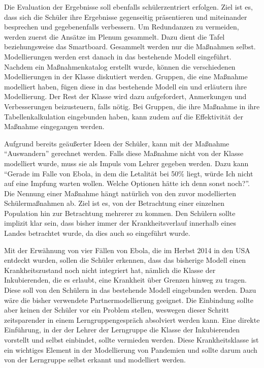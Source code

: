 Die Evaluation der Ergebnisse soll ebenfalls schülerzentriert erfolgen. Ziel ist es, dass sich die Schüler ihre Ergebnisse gegenseitig präsentieren und miteinander besprechen und gegebenenfalls verbessern. Um Redundanzen zu vermeiden, werden zuerst die Ansätze im Plenum gesammelt. Dazu dient die Tafel beziehungsweise das Smartboard. Gesammelt werden nur die Maßnahmen selbst. Modellierungen werden erst danach in das bestehende Modell eingeführt. Nachdem ein Maßnahmenkatalog erstellt wurde, können die verschiedenen Modellierungen in der Klasse diskutiert werden. Gruppen, die eine Maßnahme modelliert haben, fügen diese in das bestehende Modell ein und erläutern ihre Modellierung. Der Rest der Klasse wird dazu aufgefordert, Anmerkungen und Verbesserungen beizusteuern, falls nötig. Bei Gruppen, die ihre Maßnahme in ihre Tabellenkalkulation eingebunden haben, kann zudem auf die Effektivität der Maßnahme eingegangen werden. 

Aufgrund bereits geäußerter Ideen der Schüler, kann mit der Maßnahme ``Auswandern'' gerechnet werden. Falls diese Maßnahme nicht von der Klasse modelliert wurde, muss sie als Impuls vom Lehrer gegeben werden. Dazu kann ``Gerade im Falle von Ebola, in dem die Letalität bei 50$\%$ liegt, würde Ich nicht auf eine Impfung warten wollen. Welche Optionen hätte ich denn sonst noch?''. Die Nennung einer Maßnahme hängt natürlich von den zuvor modellierten Schülermaßnahmen ab. Ziel ist es, von der Betrachtung einer einzelnen Population hin zur Betrachtung mehrerer zu kommen. Den Schülern sollte implizit klar sein, dass bisher immer der Krankheitsverlauf innerhalb eines Landes betrachtet wurde, da dies auch so eingeführt wurde.

Mit der Erwähnung von vier Fällen von Ebola, die im Herbst 2014 in den USA entdeckt wurden, sollen die Schüler erkennen, dass das bisherige Modell einen Krankheitszustand noch nicht integriert hat, nämlich die Klasse der Inkubierenden, die es erlaubt, eine Krankheit über Grenzen hinweg zu tragen. Diese soll von den Schülern in das bestehende Modell eingebunden werden. Dazu wäre die bisher verwendete Partnermodellierung geeignet. Die Einbindung sollte aber keinen der Schüler vor ein Problem stellen, weswegen dieser Schritt zeitsparender in einem Lerngruppengespräch absolviert werden kann. Eine direkte Einführung, in der der Lehrer der Lerngruppe die Klasse der Inkubierenden vorstellt und selbst einbindet, sollte vermieden werden. Diese Krankheitsklasse ist ein wichtiges Element in der Modellierung von Pandemien und sollte darum auch von der Lerngruppe selbst erkannt und modelliert werden. 

